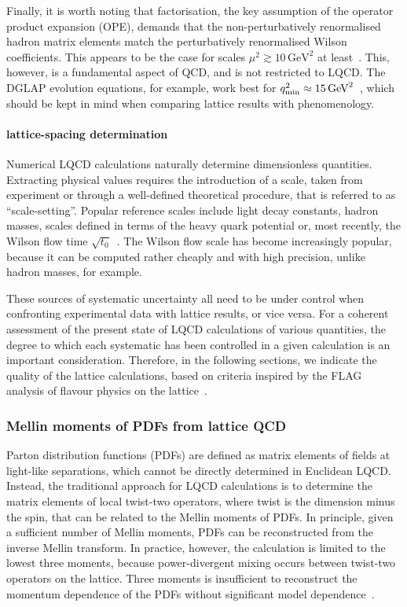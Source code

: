 Finally, it is worth noting that factorisation, the key assumption of the operator product expansion (OPE), demands that the non-perturbatively renormalised hadron matrix elements match the perturbatively renormalised Wilson coefficients. This appears to be the case for scales $\mu^2 \gtrsim 10 \, \mbox{GeV}^2$ at least~\cite{Gockeler:2010yr}. This, however, is a fundamental aspect of QCD, and is not restricted to LQCD. The DGLAP evolution equations, for example, work best for $q^2_{\rm min} \approx 15 \, \mbox{GeV}^2$~\cite{Abramowicz:2015mha}, which should be kept in mind when comparing lattice results with phenomenology.

\paragraph{lattice-spacing determination} Numerical LQCD calculations naturally determine dimensionless quantities. Extracting physical values requires the introduction of a scale, taken from experiment or through a well-defined theoretical procedure, that is referred to as ``scale-setting''. Popular reference scales include light decay constants, hadron masses, scales defined in terms of the heavy quark potential or, most recently, the Wilson flow time $\sqrt{t_0}$~\cite{Luscher:2010iy}. The Wilson flow scale has become increasingly popular, because it can be computed rather cheaply and with high precision, unlike hadron masses, for example.

These sources of systematic uncertainty all need to be under control when confronting experimental data with lattice results, or vice versa. For a coherent assessment of the present state of LQCD calculations of various quantities, the degree to which each systematic has been controlled in a given calculation is an important consideration. Therefore, in the following sections, we indicate the quality of the lattice calculations, based on criteria inspired by the FLAG analysis of flavour physics on the lattice~\cite{Aoki:2016frl}.

\subsubsection{Mellin moments of PDFs from lattice QCD}
\label{Sec:MomentsLQCD}

Parton distribution functions (PDFs) are defined as matrix elements of fields at light-like separations, which cannot be directly determined in Euclidean LQCD. Instead, the traditional approach for LQCD calculations is to determine the matrix elements of local twist-two operators, where twist is the dimension minus the spin, that can be related to the Mellin moments of PDFs. In principle, given a sufficient number of Mellin moments, PDFs can be reconstructed from the inverse Mellin transform. In practice, however, the calculation is limited to the lowest three moments, because power-divergent mixing occurs between twist-two operators on the lattice. Three moments is insufficient to reconstruct the momentum dependence of the PDFs without significant model dependence~\cite{Detmold:2003rq}.

